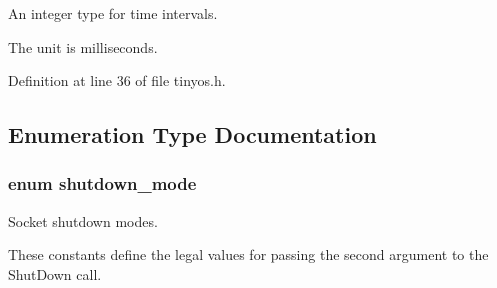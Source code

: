 An integer type for time intervals. 

The unit is milliseconds. 

Definition at line 36 of file tinyos.\+h.



\subsection{Enumeration Type Documentation}
\subsubsection[{\texorpdfstring{shutdown\+\_\+mode}{shutdown_mode}}]{\setlength{\rightskip}{0pt plus 5cm}enum {\bf shutdown\+\_\+mode}}\hypertarget{group__syscalls_ga9eb10a0a72ca3149140272e9344a272b}{}\label{group__syscalls_ga9eb10a0a72ca3149140272e9344a272b}


Socket shutdown modes. 

These constants define the legal values for passing the second argument to the {\ttfamily Shut\+Down} call.

